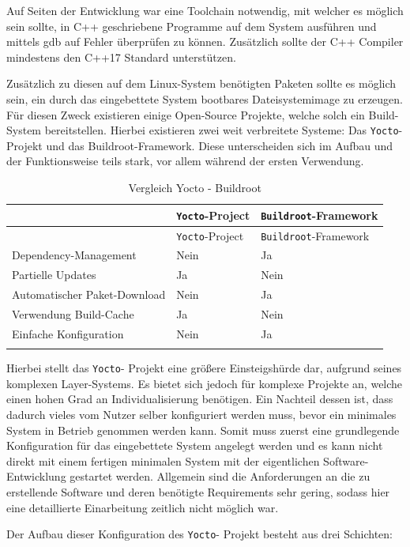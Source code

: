 Auf Seiten der Entwicklung war eine Toolchain notwendig, mit welcher es
möglich sein sollte, in C++ geschriebene Programme auf dem System
ausführen und mittels \gls{gdb} auf Fehler überprüfen zu können.
Zusätzlich sollte der C++ Compiler mindestens den C++17 Standard
unterstützen.

Zusätzlich zu diesen auf dem Linux-System benötigten Paketen sollte es
möglich sein, ein durch das eingebettete System bootbares
Dateisystemimage zu erzeugen. Für diesen Zweck existieren einige
Open-Source Projekte, welche solch ein Build-System bereitstellen.
Hierbei existieren zwei weit verbreitete Systeme: Das
\passthrough{\lstinline!Yocto!}-Projekt\cite{yoctoproject} und das
Buildroot\cite{buildrootproject}-Framework. Diese unterscheiden sich
im Aufbau und der Funktionsweise teils stark, vor allem während der
ersten Verwendung.

\begin{longtable}[]{@{}lll@{}}
\caption{Vergleich Yocto - Buildroot
\label{commchesstables}}\tabularnewline
\toprule
& \passthrough{\lstinline!Yocto!}-Project &
\passthrough{\lstinline!Buildroot!}-Framework\tabularnewline
\midrule
\endfirsthead
\toprule
& \passthrough{\lstinline!Yocto!}-Project &
\passthrough{\lstinline!Buildroot!}-Framework\tabularnewline
\midrule
\endhead
Dependency-Management & Nein & Ja\tabularnewline
Partielle Updates & Ja & Nein\tabularnewline
Automatischer Paket-Download & Nein & Ja\tabularnewline
Verwendung Build-Cache & Ja & Nein\tabularnewline
Einfache Konfiguration & Nein & Ja\tabularnewline
& &\tabularnewline
\bottomrule
\end{longtable}

Hierbei stellt das \passthrough{\lstinline!Yocto!}- Projekt eine größere
Einsteigshürde dar, aufgrund seines komplexen Layer-Systems. Es bietet
sich jedoch für komplexe Projekte an, welche einen hohen Grad an
Individualisierung benötigen. Ein Nachteil dessen ist, dass dadurch
vieles vom Nutzer selber konfiguriert werden muss, bevor ein minimales
System in Betrieb genommen werden kann. Somit muss zuerst eine
grundlegende Konfiguration für das eingebettete System angelegt werden
und es kann nicht direkt mit einem fertigen minimalen System mit der
eigentlichen Software-Entwicklung gestartet werden. Allgemein sind die
Anforderungen an die zu erstellende Software und deren benötigte
Requirements sehr gering, sodass hier eine detaillierte Einarbeitung
zeitlich nicht möglich war.

Der Aufbau dieser Konfiguration des \passthrough{\lstinline!Yocto!}-
Projekt besteht aus drei Schichten:

